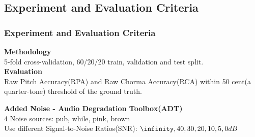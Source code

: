 \documentclass{beamer}
\begin{document}
\subsection{Experiment and Evaluation Criteria}
\begin{frame}
\frametitle{Experiment and Evaluation Criteria}
\textbf{Methodology}\\
\hspace{5mm}5-fold cross-validation, 60/20/20 train, validation and test split.\\

\textbf{Evaluation}\\
\hspace{5mm}Raw Pitch Accuracy(RPA) and Raw Chorma Accuracy(RCA) within 50 cent(a quarter-tone) threshold of the ground truth.

\textbf{Added Noise - Audio Degradation Toolbox(ADT)}\\
\hspace{5mm}4 Noise sources: pub, while, pink, brown\\
\hspace{5mm}Use different Signal-to-Noise Ratios(SNR): $\infinity, 40, 30, 20, 10, 5, 0dB$

\end{frame}
\end{document}
